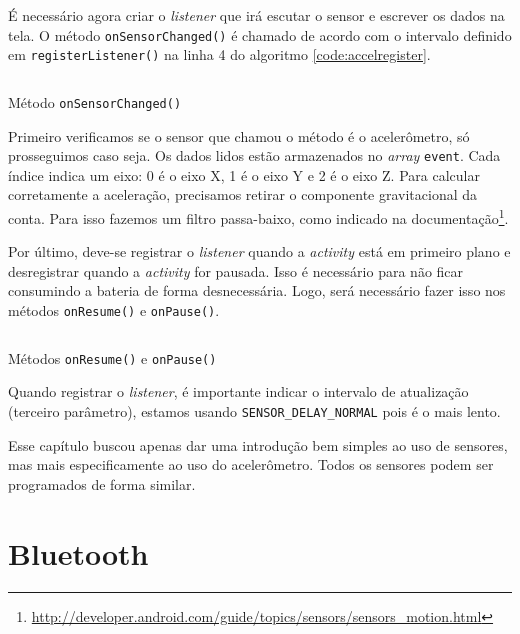 \documentclass[a4paper,12pt,brazil]{book}
\begin{document}
\begin{singlespace}
	É necessário agora criar o \emph{listener} que irá escutar o sensor e escrever os dados na tela. O método \texttt{onSensorChanged()} é chamado de acordo com o intervalo definido em \texttt{registerListener()} na linha 4 do algoritmo \ref{code:accelregister}.

	\begin{listing}[H]
	\inputminted[linenos=true,fontsize=\small,frame=lines, framesep=2mm, tabsize=2,numbersep=5pt]{java}{src/api/accelerometer/listener.java}
	\caption{Método \texttt{onSensorChanged()}}
	\label{code:accelonsensorchanged}
	\end{listing} 			
	
	Primeiro verificamos se o sensor que chamou o método é o acelerômetro, só prosseguimos caso seja. Os dados lidos estão armazenados no \emph{array} \texttt{event}. Cada índice indica um eixo: 0 é o eixo X, 1 é o eixo Y e 2 é o eixo Z. Para calcular corretamente a aceleração, precisamos retirar o componente gravitacional da conta. Para isso fazemos um filtro passa-baixo, como indicado na documentação\footnote{\href{http://developer.android.com/guide/topics/sensors/sensors\_motion.html}{http://developer.android.com/guide/topics/sensors/sensors\_motion.html}}.

	Por último, deve-se registrar o \emph{listener} quando a \emph{activity} está em primeiro plano e desregistrar quando a \emph{activity} for pausada. Isso é necessário para não ficar consumindo a bateria de forma desnecessária. Logo, será necessário fazer isso nos métodos \texttt{onResume()} e \texttt{onPause()}.

	\begin{listing}[H]
	\inputminted[linenos=true,fontsize=\small,frame=lines, framesep=2mm, tabsize=2,numbersep=5pt]{java}{src/api/accelerometer/register.java}
	\caption{Métodos \texttt{onResume()} e \texttt{onPause()}}
	\label{code:accelregister}
	\end{listing} 			

	Quando registrar o \emph{listener}, é importante indicar o intervalo de atualização (terceiro parâmetro), estamos usando \texttt{SENSOR\_DELAY\_NORMAL} pois é o mais lento. 
	
	Esse capítulo buscou apenas dar uma introdução bem simples ao uso de sensores, mas mais especificamente ao uso do acelerômetro. Todos os sensores podem ser programados de forma similar. 

\chapter{Bluetooth}


\end{singlespace}
\end{document}
